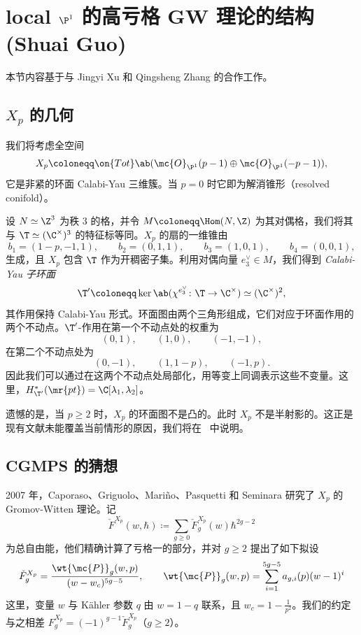 \section{\texorpdfstring{local \(\P^1\) 的高亏格 GW 理论的结构}{Structure of higher-genus GW theory of local P1} (Shuai Guo)}%
\label{sec:Structure of higher-genus GW theory of local P1 (Shuai Guo)}

本节内容基于与 Jingyi Xu 和 Qingsheng Zhang 的合作工作。

\subsection{\(X_p\) 的几何}%
\label{sub:The geometry of Xp}

我们将考虑全空间
\[ X_p \coloneqq \on{Tot}\ab(\mc{O}_{\P^1}(p-1) \oplus \mc{O}_{\P^1}(-p-1)), \]
它是非紧的环面 Calabi-Yau 三维簇。当 \(p = 0\) 时它即为解消锥形（resolved conifold）。

设 \(N \simeq \Z^3\) 为秩 \(3\) 的格，并令 \(M \coloneqq \Hom(N,\Z)\) 为其对偶格，我们将其与 \(\T \simeq (\C^{\times})^3\) 的特征标等同。\(X_p\) 的扇的一维锥由
\[ b_1 = (1-p,-1,1), \qquad b_2 = (0,1,1), \qquad b_3 = (1,0,1), \qquad b_4 = (0,0,1), \]
生成，且 \(X_p\) 包含 \(\T\) 作为开稠密子集。利用对偶向量 \(e_3^{\vee} \in M\)，我们得到 \textit{Calabi-Yau 子环面}
\[ \T' \coloneqq \ker\ab(\chi^{e_3^{\vee}} \colon \T \to \C^{\times}) \simeq (\C^{\times})^2, \]
其作用保持 Calabi-Yau 形式。环面图由两个三角形组成，它们对应于环面作用的两个不动点。\(\T'\)-作用在第一个不动点处的权重为
\[ (0,1), \qquad (1,0), \qquad (-1,-1), \]
在第二个不动点处为
\[ (0,-1), \qquad (1,1-p), \qquad (-1,p). \]
因此我们可以通过在这两个不动点处局部化，用等变上同调表示这些不变量。这里，\(H^*_{\T'}(\mr{pt}) = \C[\lambda_1,\lambda_2]\)。

遗憾的是，当 \(p \geq 2\) 时，\(X_p\) 的环面图不是凸的。此时 \(X_p\) 不是半射影的。这正是现有文献未能覆盖当前情形的原因，我们将在~ 中说明。

\subsection{CGMPS 的猜想}%
\label{sub:The conjecture of CGMPS}

2007 年，Caporaso、Griguolo、Mari\~{n}o、Pasquetti 和 Seminara 研究了 \(X_p\) 的 Gromov-Witten 理论。记
\[ \check{F}^{X_p}(w,\hbar) \coloneqq \sum_{g \geq 0} \check{F}_g^{X_p}(w) \hbar^{2g-2} \]
为总自由能，他们精确计算了亏格一的部分，并对 \(g \geq 2\) 提出了如下拟设
\begin{equation}\label{eqn:cgmps ansatz}
    \check{F}_g^{X_p} = \frac{\wt{\mc{P}}_g(w,p)}{(w-w_c)^{5g-5}}, \qquad \wt{\mc{P}}_g(w,p) = \sum_{i=1}^{5g-5} a_{g,i}(p)(w-1)^i
\end{equation}
这里，变量 \(w\) 与 Kähler 参数 \(q\) 由 \(w = 1-q\) 联系，且 \(w_c = 1 - \frac{1}{p^2}\)。我们的约定与之相差 \(F_g^{X_p} = (-1)^{g-1}\check{F}_g^{X_p}\)（\(g \geq 2\)）。


